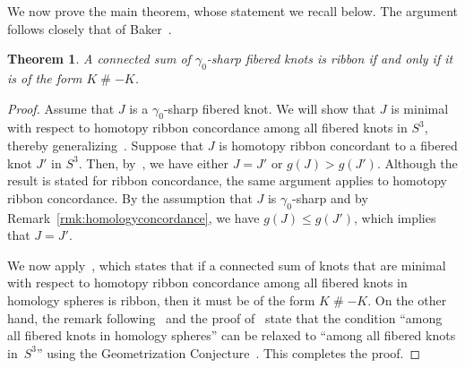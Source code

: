 \documentclass[11pt, reqno]{amsart}
\newtheorem{theorem}{Theorem}[section]
\theoremstyle{definition}
\theoremstyle{remark}
\numberwithin{equation}{section}
\begin{document}
%

We now prove the main theorem, whose statement we recall below.  
The argument follows closely that of Baker~\cite[Theorem~3]{Baker:2016}.






\setcounter{theorem}{0}
\renewcommand{\thetheorem}{1.1}
\begin{theorem}\label{thm:mainbody}
A connected sum of $\gamma_0$-sharp fibered knots  is ribbon if and only if it is of the form $K \mathbin{\#} -K$.
\end{theorem}
\renewcommand{\thetheorem}{\thesection.\arabic{theorem}}



\begin{proof}
Assume that $J$ is a $\gamma_0$-sharp fibered knot.  
We will show that $J$ is minimal with respect to homotopy ribbon concordance among all fibered knots in $S^3$, thereby generalizing~\cite[Lemma~2]{Baker:2016}.  
Suppose that $J$ is homotopy ribbon concordant to a fibered knot $J'$ in $S^3$.  
Then, by~\cite[Lemma~3.4]{Gordon:1981}, we have either $J = J'$ or $g(J) > g(J')$.  
Although the result is stated for ribbon concordance, the same argument applies to homotopy ribbon concordance.  
By the assumption that $J$ is $\gamma_0$-sharp and by Remark~\ref{rmk:homologyconcordance}, we have $g(J) \leq g(J')$, which implies that $J = J'$.


We now apply~\cite[Theorem~5.5]{Miyazaki:1994}, which states that if a connected sum of knots that are minimal with respect to homotopy ribbon concordance among all fibered knots in homology spheres is ribbon, then it must be of the form $K \mathbin{\#} -K$. On the other hand, the remark following~\cite[Lemma~1.3]{Miyazaki:1994} and the proof of~\cite[Theorem~3]{Baker:2016} state that the condition ``among all fibered knots in homology spheres'' can be relaxed to ``among all fibered knots in~$S^3$'' using the Geometrization Conjecture~\cite{Perelman:2002-1, Perelman:2003-1, Perelman:2003-2}.  
This completes the proof.
 \end{proof}
\end{document}
